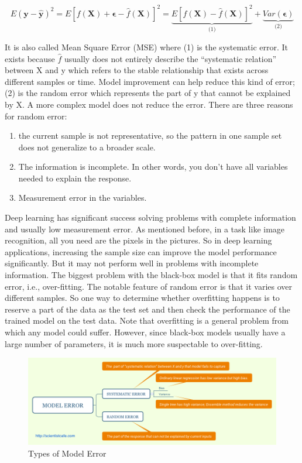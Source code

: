\documentclass[12pt,]{krantz}
\providecommand{\tightlist}{%
  \setlength{\itemsep}{0pt}\setlength{\parskip}{0pt}}
\theoremstyle{definition}
\theoremstyle{definition}
\theoremstyle{definition}
\theoremstyle{remark}
\begin{document}
\[E(\mathbf{y}-\hat{\mathbf{y}})^{2}=E[f(\mathbf{X})+\mathbf{\epsilon}-\hat{f}(\mathbf{X})]^{2}=\underset{\text{(1)}}{\underbrace{E[f(\mathbf{X})-\hat{f}(\mathbf{X})]^{2}}}+\underset{\text{(2)}}{\underbrace{Var(\mathbf{\epsilon})}}
\label{eq:error}\]

It is also called Mean Square Error (MSE) where (1) is the systematic
error. It exists because \(\hat{f}\) usually does not entirely describe
the ``systematic relation'' between X and y which refers to the stable
relationship that exists across different samples or time. Model
improvement can help reduce this kind of error; (2) is the random error
which represents the part of y that cannot be explained by X. A more
complex model does not reduce the error. There are three reasons for
random error:

\begin{enumerate}
\def\labelenumi{\arabic{enumi}.}
\tightlist
\item
  the current sample is not representative, so the pattern in one sample
  set does not generalize to a broader scale.
\item
  The information is incomplete. In other words, you don't have all
  variables needed to explain the response.
\item
  Measurement error in the variables.
\end{enumerate}

Deep learning has significant success solving problems with complete
information and usually low measurement error. As mentioned before, in a
task like image recognition, all you need are the pixels in the
pictures. So in deep learning applications, increasing the sample size
can improve the model performance significantly. But it may not perform
well in problems with incomplete information. The biggest problem with
the black-box model is that it fits random error, i.e., over-fitting.
The notable feature of random error is that it varies over different
samples. So one way to determine whether overfitting happens is to
reserve a part of the data as the test set and then check the
performance of the trained model on the test data. Note that overfitting
is a general problem from which any model could suffer. However, since
black-box models usually have a large number of parameters, it is much
more suspectable to over-fitting.

\begin{figure}
\centering
\includegraphics{images/ModelError.png}
\caption{Types of Model Error}
\end{figure}
\end{document}
